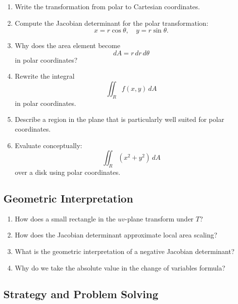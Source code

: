 \begin{enumerate}

\item Write the transformation from polar to Cartesian coordinates.

\item Compute the Jacobian determinant for the polar transformation:
  \[
    x = r\cos\theta, \quad y = r\sin\theta.
  \]

\item Why does the area element become
  \[
    dA = r\, dr\, d\theta
  \]
  in polar coordinates?

\item Rewrite the integral
  \[
    \iint_R f(x,y)\, dA
  \]
  in polar coordinates.

\item Describe a region in the plane that is particularly well suited for polar coordinates.

\item Evaluate conceptually:
  \[
    \iint_R (x^2 + y^2)\, dA
  \]
  over a disk using polar coordinates.

\end{enumerate}

\subsection{Geometric Interpretation}

\begin{enumerate}

\item  How does a small rectangle in the $uv$-plane transform under $T$?

\item  How does the Jacobian determinant approximate local area scaling?

\item  What is the geometric interpretation of a negative Jacobian determinant?

\item Why do we take the absolute value in the change of variables formula?

\end{enumerate}

\subsection{Strategy and Problem Solving}

